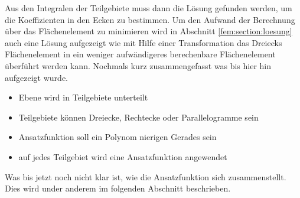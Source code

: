 Aus den Integralen der Teilgebiete muss dann die Lösung gefunden werden, um die Koeffizienten in den Ecken zu bestimmen. Um den Aufwand der Berechnung über das Flächenelement zu minimieren wird in Abschnitt \ref{fem:section:loesung} auch eine Lösung aufgezeigt wie mit Hilfe einer Transformation das Dreiecks Flächenelement in ein weniger aufwändigeres berechenbare Flächenelement überführt werden kann.
Nochmals kurz zusammengefasst was bis hier hin aufgezeigt wurde.
\begin{itemize}
	\item Ebene wird in Teilgebiete unterteilt
	\item Teilgebiete können Dreiecke, Rechtecke oder Parallelogramme sein
	\item Ansatzfunktion soll ein Polynom nierigen Gerades sein
	\item auf jedes Teilgebiet wird eine Ansatzfunktion angewendet
\end{itemize} 
Was bis jetzt noch nicht klar ist, wie die Ansatzfunktion sich zusammenstellt. Dies wird under anderem im folgenden Abschnitt beschrieben.





